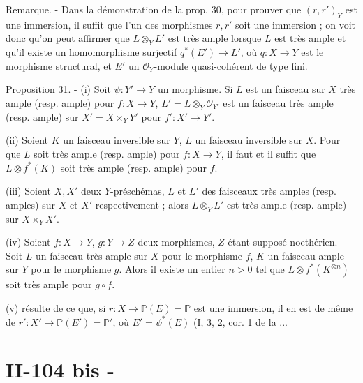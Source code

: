Remarque. - Dans la démonstration de la prop. 30, pour prouver que $(r, r')_Y$ est une immersion, il suffit que l'un des morphismes $r, r'$ soit une immersion ; on voit donc qu'on peut affirmer que $L \otimes_Y L'$ est très ample lorsque $L$ est très ample et qu'il existe un homomorphisme surjectif $q^*(E') \to L'$, où $q : X \to Y$ est le morphisme structural, et $E'$ un $\mathcal{O}_Y$-module quasi-cohérent de type fini.

Proposition 31. - (i) Soit $\psi : Y' \to Y$ un morphisme. Si $L$ est un faisceau sur $X$ très ample (resp. ample) pour $f : X \to Y$, $L' = L \otimes_Y \mathcal{O}_{Y'}$ est un faisceau très ample (resp. ample) sur $X' = X \times_Y Y'$ pour $f' : X' \to Y'$.

(ii) Soient $K$ un faisceau inversible sur $Y$, $L$ un faisceau inversible sur $X$. Pour que $L$ soit très ample (resp. ample) pour $f : X \to Y$, il faut et il suffit que $L \otimes f^*(K)$ soit très ample (resp. ample) pour $f$.

(iii) Soient $X, X'$ deux $Y$-préschémas, $L$ et $L'$ des faisceaux très amples (resp. amples) sur $X$ et $X'$ respectivement ; alors $L \otimes_Y L'$ est très ample (resp. ample) sur $X \times_Y X'$.

(iv) Soient $f : X \to Y$, $g : Y \to Z$ deux morphismes, $Z$ étant supposé noethérien. Soit $L$ un faisceau très ample sur $X$ pour le morphisme $f$, $K$ un faisceau ample sur $Y$ pour le morphisme $g$. Alors il existe un entier $n > 0$ tel que $L \otimes f^*(K^{\otimes n})$ soit très ample pour $g \circ f$.

(v) résulte de ce que, si $r : X \to \mathbb{P}(E) = \mathbb{P}$ est une immersion, il en est de même de $r' : X' \to \mathbb{P}(E') = \mathbb{P}'$, où $E' = \psi^*(E)$ (I, 3, 2, cor. 1 de la ...

\newpage


\section*{II-104 bis -}

